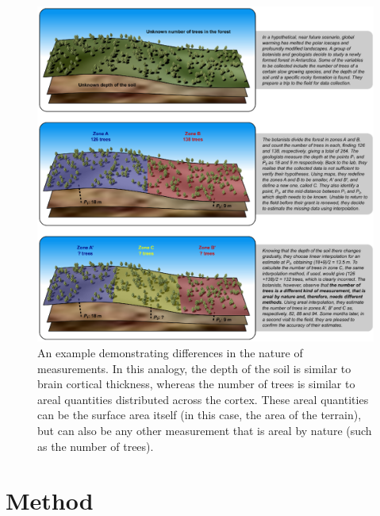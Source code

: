 \begin{figure}[!p]  %
\centering
\includegraphics[width=14cm]{images/forest.eps}
\caption[Example demonstrating differences between area and point measurements.]{An example demonstrating differences in the nature of measurements. In this analogy, the depth of the soil is similar to brain cortical thickness, whereas the number of trees is similar to areal quantities distributed across the cortex. These areal quantities can be the surface area itself (in this case, the area of the terrain), but can also be any other measurement that is areal by nature (such as the number of trees).}
\label{fig:areal:forest}
\end{figure}

\section{Method}

